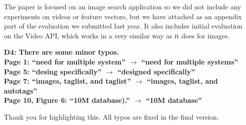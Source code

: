 \documentclass[11pt]{proposalnsf}
\begin{document}
The paper is focused on an image search application so we did not include any
experiments on videos or feature vectors, but we have attached as an appendix
part of the evaluation we submitted last year.
It also includes initial evaluation on the Video API, which works in a very
similar way as it does for images.

\bigskip
\noindent %
\textbf{
D4: There are some minor typos.\\
Page 1: “need for multiple system” $\rightarrow$  “need for multiple systems”\\
Page 5: “desing specifically” $\rightarrow$ “designed specifically”\\
Page 7: “images, taglist, and taglist” $\rightarrow$ “images, taglist, and autotags”\\
Page 10, Figure 6: “10M database).” $\rightarrow$ “10M database”
}\bigskip

Thank you for highlighting this. All typos are fixed in the final version.

\end{document}
